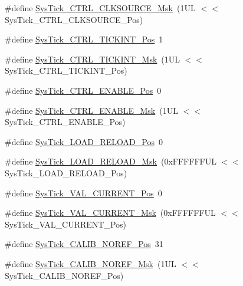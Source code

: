 \begin{DoxyCompactItemize}
\item 
\#define \hyperlink{group___c_m_s_i_s___sys_tick_gaa41d06039797423a46596bd313d57373}{Sys\-Tick\-\_\-\-C\-T\-R\-L\-\_\-\-C\-L\-K\-S\-O\-U\-R\-C\-E\-\_\-\-Msk}~(1\-U\-L $<$$<$ Sys\-Tick\-\_\-\-C\-T\-R\-L\-\_\-\-C\-L\-K\-S\-O\-U\-R\-C\-E\-\_\-\-Pos)
\item 
\#define \hyperlink{group___c_m_s_i_s___sys_tick_ga88f45bbb89ce8df3cd2b2613c7b48214}{Sys\-Tick\-\_\-\-C\-T\-R\-L\-\_\-\-T\-I\-C\-K\-I\-N\-T\-\_\-\-Pos}~1
\item 
\#define \hyperlink{group___c_m_s_i_s___sys_tick_ga95bb984266ca764024836a870238a027}{Sys\-Tick\-\_\-\-C\-T\-R\-L\-\_\-\-T\-I\-C\-K\-I\-N\-T\-\_\-\-Msk}~(1\-U\-L $<$$<$ Sys\-Tick\-\_\-\-C\-T\-R\-L\-\_\-\-T\-I\-C\-K\-I\-N\-T\-\_\-\-Pos)
\item 
\#define \hyperlink{group___c_m_s_i_s___sys_tick_ga0b48cc1e36d92a92e4bf632890314810}{Sys\-Tick\-\_\-\-C\-T\-R\-L\-\_\-\-E\-N\-A\-B\-L\-E\-\_\-\-Pos}~0
\item 
\#define \hyperlink{group___c_m_s_i_s___sys_tick_ga16c9fee0ed0235524bdeb38af328fd1f}{Sys\-Tick\-\_\-\-C\-T\-R\-L\-\_\-\-E\-N\-A\-B\-L\-E\-\_\-\-Msk}~(1\-U\-L $<$$<$ Sys\-Tick\-\_\-\-C\-T\-R\-L\-\_\-\-E\-N\-A\-B\-L\-E\-\_\-\-Pos)
\item 
\#define \hyperlink{group___c_m_s_i_s___sys_tick_gaf44d10df359dc5bf5752b0894ae3bad2}{Sys\-Tick\-\_\-\-L\-O\-A\-D\-\_\-\-R\-E\-L\-O\-A\-D\-\_\-\-Pos}~0
\item 
\#define \hyperlink{group___c_m_s_i_s___sys_tick_ga265912a7962f0e1abd170336e579b1b1}{Sys\-Tick\-\_\-\-L\-O\-A\-D\-\_\-\-R\-E\-L\-O\-A\-D\-\_\-\-Msk}~(0x\-F\-F\-F\-F\-F\-F\-U\-L $<$$<$ Sys\-Tick\-\_\-\-L\-O\-A\-D\-\_\-\-R\-E\-L\-O\-A\-D\-\_\-\-Pos)
\item 
\#define \hyperlink{group___c_m_s_i_s___sys_tick_ga3208104c3b019b5de35ae8c21d5c34dd}{Sys\-Tick\-\_\-\-V\-A\-L\-\_\-\-C\-U\-R\-R\-E\-N\-T\-\_\-\-Pos}~0
\item 
\#define \hyperlink{group___c_m_s_i_s___sys_tick_gafc77b56d568930b49a2474debc75ab45}{Sys\-Tick\-\_\-\-V\-A\-L\-\_\-\-C\-U\-R\-R\-E\-N\-T\-\_\-\-Msk}~(0x\-F\-F\-F\-F\-F\-F\-U\-L $<$$<$ Sys\-Tick\-\_\-\-V\-A\-L\-\_\-\-C\-U\-R\-R\-E\-N\-T\-\_\-\-Pos)
\item 
\#define \hyperlink{group___c_m_s_i_s___sys_tick_ga534dbe414e7a46a6ce4c1eca1fbff409}{Sys\-Tick\-\_\-\-C\-A\-L\-I\-B\-\_\-\-N\-O\-R\-E\-F\-\_\-\-Pos}~31
\item 
\#define \hyperlink{group___c_m_s_i_s___sys_tick_ga3af0d891fdd99bcc8d8912d37830edb6}{Sys\-Tick\-\_\-\-C\-A\-L\-I\-B\-\_\-\-N\-O\-R\-E\-F\-\_\-\-Msk}~(1\-U\-L $<$$<$ Sys\-Tick\-\_\-\-C\-A\-L\-I\-B\-\_\-\-N\-O\-R\-E\-F\-\_\-\-Pos)

\end{DoxyCompactItemize}
